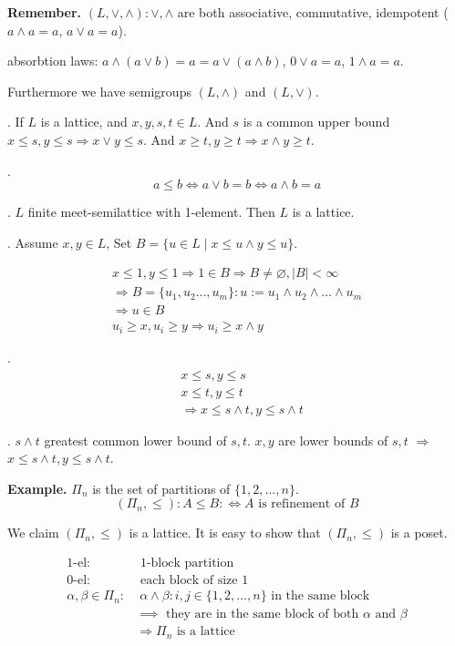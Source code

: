\textbf{Remember.}
$(L, \vee, \wedge): \vee, \wedge$ are both associative, commutative, idempotent ($a\wedge a = a$, $a\vee a = a$). 

absorbtion laws: $a \wedge(a \vee b) = a = a \vee ( a \wedge b)$, $0 \vee a = a$, $1 \wedge a = a$. 

Furthermore we have semigroups $(L, \wedge)$ and $(L, \vee)$.

\Lemma.
If $L$ is a lattice, and $x,y,s,t \in L$. And $s$ is a common upper bound $x \leq s, y \leq s \Rightarrow x \vee y \leq s$. 
And $x \geq t, y \geq t \Rightarrow x \wedge y \geq t$. 

\Remark.
\[
  a \leq b \Leftrightarrow a \vee b = b \Leftrightarrow a \wedge b = a
\]

\Lemma.
$L$ finite meet-semilattice with 1-element. Then $L$ is a lattice.

\Proof.
Assume $x,y \in L$, Set $B = \{u \in L \mid x \leq u \wedge y \leq u\}$. 

\begin{align*}
  x \leq 1, y \leq 1
    \Rightarrow 1 \in B \Rightarrow B \neq \varnothing, |B| < \infty \\
  \Rightarrow B= \{u_1, u_2 \ldots , u_m\}: 
    u:= u_1 \wedge u_2 \wedge \ldots \wedge u_m \\
  \Rightarrow u \in B \\
  u_i \geq x, u_i \geq y \Rightarrow u_i \geq x \wedge y
\end{align*}


\Lemma.
\begin{align*}
  &x \leq s, y \leq s \\
  &x \leq t, y \leq t \\
  &\Rightarrow x \leq s \wedge t, y \leq s \wedge t
\end{align*}

\Proof.
$s \wedge t$ greatest common lower bound of $s,t$. 
$x,y$ are lower bounds of $s,t$ $\Rightarrow$ $x \leq s \wedge t, y \leq s \wedge t$. 

\textbf{Example.}
$\Pi_n$ is the set of partitions of $\{1,2,..., n\}$. 
\[
    (\Pi_n, \leq): A \leq B: \iff \text{$A$ is refinement of $B$}
\]

We claim $(\Pi_n, \leq)$ is a lattice. 
It is easy to show that $(\Pi_n, \leq)$ is a poset. 

\begin{align*}
  \text{1-el}: & \text{ 1-block partition} \\
  \text{0-el}: & \text{ each block of size 1} \\
  \alpha, \beta \in \Pi_n: & \;\alpha \wedge \beta: i,j \in \{1,2,\ldots,n\} 
    \text{ in the same block } \\
    & \implies \text{ they are in the same block of both $\alpha$ and $\beta$} \\
  &\Rightarrow \Pi_n \text{ is a lattice}
\end{align*}

